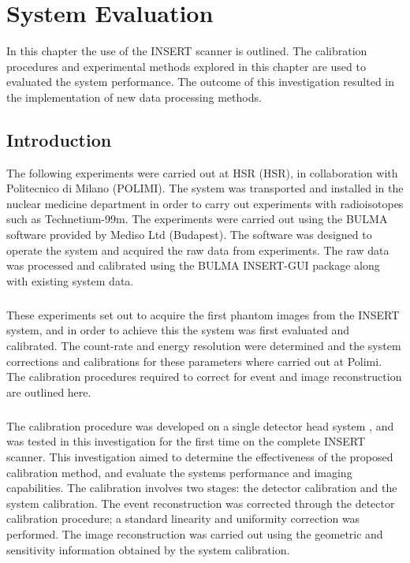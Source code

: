\chapter{System Evaluation}
\label{Milan}



In this chapter the use of the \acrshort{INSERT} scanner is outlined. The calibration procedures and experimental methods explored in this chapter are used to evaluated the system performance. The outcome of this investigation resulted in the implementation of new data processing methods. 

\section{Introduction}
The following experiments were carried out at \acrlong{HSR} (\acrshort{HSR}), in collaboration with Politecnico di Milano (POLIMI). The system was transported and installed in the nuclear medicine department in order to carry out experiments with radioisotopes such as Technetium-99m. The experiments were carried out using the BULMA software provided by Mediso Ltd (Budapest). The software was designed to operate the system and acquired the raw data from experiments. The raw data was processed and calibrated using the BULMA INSERT-GUI package along with existing system data. 
\paragraph{}
These experiments set out to acquire the first phantom images from the \acrshort{INSERT} system, and in order to achieve this the system was first evaluated and calibrated. The count-rate and energy resolution were determined and the system corrections and calibrations for these parameters where carried out at Polimi. The calibration procedures required to correct for event and image reconstruction are outlined here.
\paragraph{}
The calibration procedure was developed on a single detector head system \cite{8069508}, and was tested in this investigation for the first time on the complete \acrshort{INSERT} scanner. This investigation aimed to determine the effectiveness of the proposed calibration method, and evaluate the systems performance and imaging capabilities. The calibration involves two stages: the detector calibration and the system calibration. The event reconstruction was corrected through the detector calibration procedure; a standard linearity and uniformity correction was performed. The image reconstruction was carried out using the geometric and sensitivity information obtained by the system calibration.

